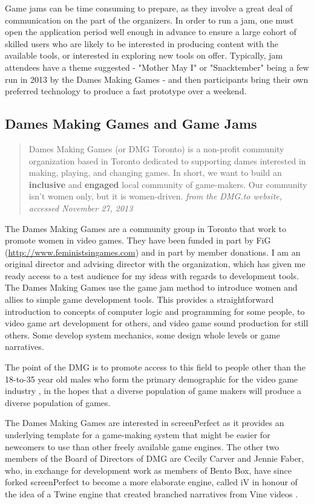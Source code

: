 Game jams can be time consuming to prepare, as they involve a great deal of communication on the part of the organizers. In order to run a jam, one must open the application period well enough in advance to ensure a large cohort of skilled users who are likely to be interested in producing content with the available tools, or interested in exploring new tools on offer. Typically, jam attendees have a theme suggested - "Mother May I" or "Snacktember" being a few run in 2013 by the Dames Making Games - and then participants bring their own preferred technology to produce a fast prototype over a weekend.

\subsection{Dames Making Games and Game Jams}
\begin{quote}
Dames Making Games (or DMG Toronto) is a non-profit community organization based in Toronto dedicated to supporting dames interested in making, playing, and changing games. In short, we want to build an \textbf{inclusive} and \textbf{engaged} local community of game-makers. Our community isn't women only, but it is women-driven.
\textit{from the DMG.to website, accessed November 27, 2013}
\end{quote}
The Dames Making Games are a community group in Toronto that work to promote women in video games. They have been funded in part by FiG (\url{http://www.feministsingames.com}) and in part by member donations. I am an original director and advising director with the organization, which has given me ready access to a test audience for my ideas with regards to development tools. The Dames Making Games use the game jam method to introduce women and allies to simple game development tools. This provides a straightforward introduction to concepts of computer logic and programming for some people, to video game art development for others, and video game sound production for still others. Some develop system mechanics, some design whole levels or game narratives. 

The point of the DMG is to promote access to this field to people other than the 18-to-35 year old males who form the primary demographic for the video game industry \parencite{igda}\parencite{esa}, in the hopes that a diverse population of game makers will produce a diverse population of games.

The Dames Making Games are interested in screenPerfect as it provides an underlying template for a game-making system that might be easier for newcomers to use than other freely available game engines. The other two members of the Board of Directors of DMG are Cecily Carver and Jennie Faber, who, in exchange for development work as members of Bento Box, have since forked screenPerfect to become a more elaborate engine, called iV in honour of the idea of a Twine engine that created branched narratives from Vine videos \parencite{klimas}.

